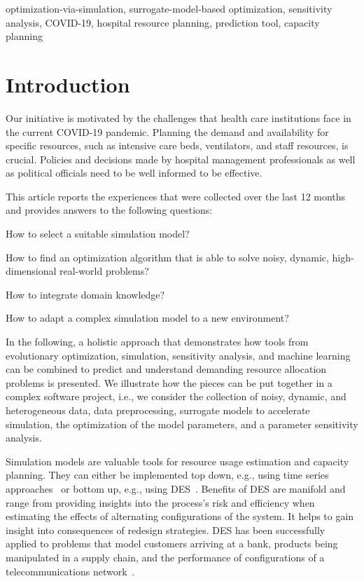 \documentclass[conference]{IEEEtran}
\begin{document}
\begin{IEEEkeywords}
optimization-via-simulation, surrogate-model-based optimization, sensitivity analysis, COVID-19, hospital resource planning, prediction tool, capacity planning
\end{IEEEkeywords}


\section{Introduction}\label{sec:intro}
Our initiative is motivated by the challenges that health care institutions face in the current COVID-19 pandemic. 
Planning the demand and availability for specific resources, such as intensive care beds, ventilators, and staff resources, is crucial.
Policies and decisions made by hospital management professionals as well as political officials need to be well informed to be effective.

This article reports the experiences that were collected over the last 12 months and provides answers to the following questions:
\begin{compactenum}[(Q-1)]
\item How to select a suitable simulation model?
\item How to find an optimization algorithm that is able to solve noisy, dynamic, high-dimensional real-world problems?
\item How to integrate domain knowledge?
\item How to adapt a complex simulation model to a new environment?
\end{compactenum}
In the following, a holistic approach that demonstrates how tools from evolutionary optimization, simulation, sensitivity analysis, and machine learning can be combined to predict and understand demanding resource allocation problems is presented.
We illustrate how the pieces can be put together in a complex software project, i.e., we consider the collection of noisy, dynamic, and heterogeneous data, data preprocessing, surrogate models to accelerate simulation, the optimization of the model parameters, and a parameter sensitivity analysis.

Simulation models are valuable tools for resource usage estimation and capacity planning.
They can either be implemented top down, e.g., using time series approaches~\cite{Hynd08b} or bottom up, e.g., using \gls{DES}~\cite{Bank01a}.
Benefits of \gls{DES} are manifold and range from providing insights into the process’s risk and efficiency when estimating the effects of alternating configurations of the system.
It helps to gain insight into consequences of redesign strategies.
\gls{DES} has been successfully applied to problems that model customers arriving at a bank,   
products being manipulated in a supply chain, and the performance of configurations of a telecommunications network~\cite{Bank01a}.
\end{document}
